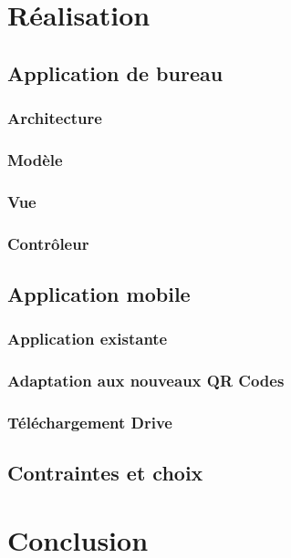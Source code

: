 \documentclass{report}
\begin{document}
\chapter{Réalisation}

	\section{Application de bureau}

		\subsection{Architecture}
			

		\subsection{Modèle}
			

		\subsection{Vue}
			
				
		\subsection{Contrôleur}
			

	\section{Application mobile}
		
		\subsection{Application existante}
			
		
		\subsection{Adaptation aux nouveaux QR Codes}
			
		
		\subsection{Téléchargement Drive}
			
			
	\section{Contraintes et choix}
		


\chapter{Conclusion}
	
\end{document}
